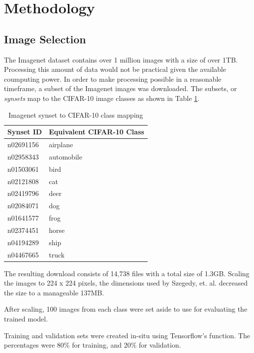 \documentclass{article}
\begin{document}
\section{Methodology}

\subsection{Image Selection}
The Imagenet dataset contains over 1 million images with a size of over 1TB. Processing this amount of data would not be practical given the available coumputing power. In order to make processing possible in a reasonable timeframe, a subset of the Imagenet images was downloaded. The subsets, or \textit{synsets} map to the CIFAR-10 image classes as shown in Table \ref{tab:synsets}.

\begin{table}[ht]
    \centering
    \begin{tabular}{ll}
    \hline
    \textbf{Synset ID} & \textbf{Equivalent CIFAR-10 Class} \\ \hline
    n02691156 & airplane \\ \hline
    n02958343 & automobile \\ \hline
    n01503061 & bird \\ \hline
    n02121808 & cat \\ \hline
    n02419796 & deer \\ \hline
    n02084071 & dog \\ \hline
    n01641577 & frog \\ \hline
    n02374451 & horse \\ \hline
    n04194289 & ship \\ \hline
    n04467665 & truck \\ \hline
    \end{tabular}
    \caption{Imagenet synset to CIFAR-10 class mapping}
    \label{tab:synsets}
\end{table}

The resulting download consists of 14,738 files with a total size of 1.3GB. Scaling the images to 224 x 224 pixels, the dimensions used by Szegedy, et. al. decreased the size to a manageable 137MB.

After scaling, 100 images from each class were set aside to use for evaluating the trained model.

Training and validation sets were created in-situ using Tensorflow's  function. The percentages were 80\% for training, and 20\% for validation.
\end{document}
